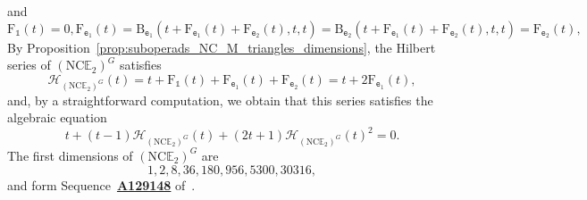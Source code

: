 \documentclass[10pt,reqno]{amsart}
\numberwithin{equation}{subsection}
\newcommand{\Ebb}{\mathbb{E}}
\newcommand{\Ett}{\mathtt{e}}
\newcommand{\NC}{\mathrm{NC}}
\newcommand{\Unit}{\mathds{1}}
\newcommand{\Hilbert}{\mathcal{H}}
\newcommand{\SeriesBubbles}{\mathrm{B}}
\newcommand{\SeriesElements}{\mathrm{F}}
\newcommand{\OEIS}[1]{\href{http://oeis.org/#1}{{\bf #1}}}
\begin{document}
\noindent and
\begin{subequations}
\begin{equation}
    \SeriesElements_\Unit(t) = 0,
\end{equation}
\begin{equation}
    \SeriesElements_{\Ett_1}(t) =
    \SeriesBubbles_{\Ett_1}(
        t + \SeriesElements_{\Ett_1}(t) + \SeriesElements_{\Ett_2}(t),
        t, t)
    =
    \SeriesBubbles_{\Ett_2}(
        t + \SeriesElements_{\Ett_1}(t) + \SeriesElements_{\Ett_2}(t),
        t, t)
    =
    \SeriesElements_{\Ett_2}(t),
\end{equation}
\end{subequations}
By Proposition~\ref{prop:suboperads_NC_M_triangles_dimensions},
the Hilbert series of $(\NC\Ebb_2)^G$ satisfies
\begin{equation}
    \Hilbert_{(\NC\Ebb_2)^G}(t) = t + \SeriesElements_\Unit(t) +
    \SeriesElements_{\Ett_1}(t) +
    \SeriesElements_{\Ett_2}(t) = t + 2 \SeriesElements_{\Ett_1}(t),
\end{equation}
and, by a straightforward computation, we obtain that this series
satisfies the algebraic equation
\begin{equation}
    t + (t - 1) \Hilbert_{(\NC\Ebb_2)^G}(t) +
    (2t + 1)\Hilbert_{(\NC\Ebb_2)^G}(t)^2 = 0.
\end{equation}
The first dimensions of $(\NC\Ebb_2)^G$ are
\begin{equation}
    1, 2, 8, 36, 180, 956, 5300, 30316,
\end{equation}
and form Sequence~\OEIS{A129148} of~\cite{Slo}.
\medskip

\end{document}

